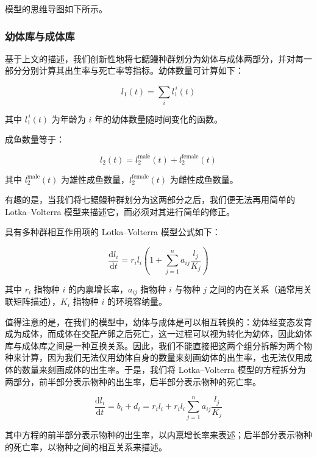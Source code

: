 \documentclass[11pt,a4paper]{ctexart}
\begin{document}
模型的思维导图如下所示。

\subsubsection{幼体库与成体库}

基于上文的描述，我们创新性地将七鳃鳗种群划分为幼体与成体两部分，并对每一部分分别计算其出生率与死亡率等指标。幼体数量可计算如下：

\begin{equation}
l_1(t)=\sum_{i}l_1^{\,i}(t)
\end{equation}

其中 $l_1^{\,i}(t)$ 为年龄为 $i$ 年的幼体数量随时间变化的函数。

成鱼数量等于：

\begin{equation}
l_2(t)=l_2^{\mathrm{male}}(t)+l_2^{\mathrm{female}}(t)
\end{equation}

其中 $l_2^{\mathrm{male}}(t)$ 为雄性成鱼数量，$l_2^{\mathrm{female}}(t)$ 为雌性成鱼数量。

有趣的是，当我们将七鳃鳗种群划分为这两部分之后，我们便无法再用简单的 Lotka--Volterra 模型来描述它，而必须对其进行简单的修正。

具有多种群相互作用项的 Lotka--Volterra 模型公式如下：

\begin{equation}
\frac{\mathrm{d}l_i}{\mathrm{d}t}=r_i l_i\left(1+\sum_{j=1}^{n}a_{ij}\frac{l_j}{K_j}\right)
\end{equation}

其中 $r_i$ 指物种 $i$ 的内禀增长率，$a_{ij}$ 指物种 $i$ 与物种 $j$ 之间的内在关系（通常用关联矩阵描述），$K_i$ 指物种 $i$ 的环境容纳量。

值得注意的是，在我们的模型中，幼体与成体是可以相互转换的：幼体经变态发育成为成体，而成体在交配产卵之后死亡，这一过程可以视为转化为幼体，因此幼体库与成体库之间是一种互换关系。因此，我们不能直接把这两个组分拆解为两个物种来计算，因为我们无法仅用幼体自身的数量来刻画幼体的出生率，也无法仅用成体的数量来刻画成体的出生率。于是，我们将 Lotka--Volterra 模型的方程拆分为两部分，前半部分表示物种的出生率，后半部分表示物种的死亡率。

\begin{equation}
\frac{\mathrm{d}l_i}{\mathrm{d}t}=b_i+d_i=r_i l_i+r_i l_i\sum_{j=1}^{n}a_{ij}\frac{l_j}{K_j}
\end{equation}

其中方程的前半部分表示物种的出生率，以内禀增长率来表述；后半部分表示物种的死亡率，以物种之间的相互关系来描述。
\end{document}
